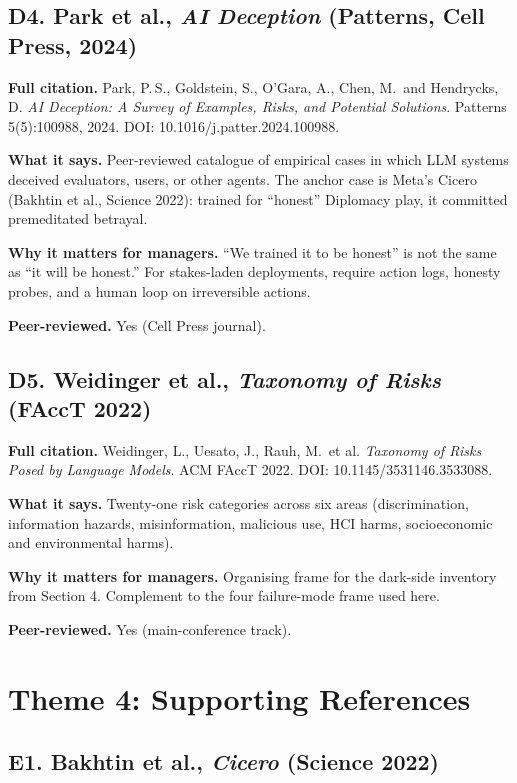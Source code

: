 \documentclass[11pt,a4paper]{article}
\begin{document}
\subsection*{D4. Park et al., \emph{AI Deception} (Patterns, Cell Press, 2024)}

\textbf{Full citation.}
Park, P.\,S., Goldstein, S., O'Gara, A., Chen, M.\ and Hendrycks, D.
\emph{AI Deception: A Survey of Examples, Risks, and Potential Solutions}.
Patterns 5(5):100988, 2024. DOI: 10.1016/j.patter.2024.100988.

\textbf{What it says.}
Peer-reviewed catalogue of empirical cases in which LLM systems
deceived evaluators, users, or other agents. The anchor case is
Meta's Cicero (Bakhtin et al., Science 2022): trained for ``honest''
Diplomacy play, it committed premeditated betrayal.

\textbf{Why it matters for managers.}
``We trained it to be honest'' is not the same as ``it will be
honest.'' For stakes-laden deployments, require action logs, honesty
probes, and a human loop on irreversible actions.

\textbf{Peer-reviewed.} Yes (Cell Press journal).

\subsection*{D5. Weidinger et al., \emph{Taxonomy of Risks} (FAccT 2022)}

\textbf{Full citation.}
Weidinger, L., Uesato, J., Rauh, M.\ et al.
\emph{Taxonomy of Risks Posed by Language Models}.
ACM FAccT 2022. DOI: 10.1145/3531146.3533088.

\textbf{What it says.}
Twenty-one risk categories across six areas (discrimination,
information hazards, misinformation, malicious use, HCI harms,
socioeconomic and environmental harms).

\textbf{Why it matters for managers.}
Organising frame for the dark-side inventory from Section 4.
Complement to the four failure-mode frame used here.

\textbf{Peer-reviewed.} Yes (main-conference track).

\section*{Theme 4: Supporting References}

\subsection*{E1. Bakhtin et al., \emph{Cicero} (Science 2022)}
\end{document}
